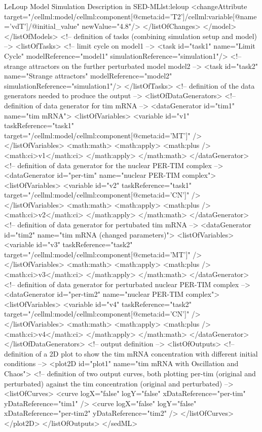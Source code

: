 \begin{myXmlLst}{LeLoup Model Simulation Description in SED-ML}{lst:leloup}
    <changeAttribute target="/cellml:model/cellml:component[@cmeta:id='T2']/cellml:variable[@name='vdT']/@initial_value" newValue="4.8"/>        
   </listOfChanges>
  </model>
 </listOfModels>
 <!-- definition of tasks (combining simulation setup and model) --> 
 <listOfTasks>
  <!-- limit cycle on model1 --> 
  <task id="task1" name="Limit Cycle" modelReference="model1" simulationReference="simulation1"/>
  <!-- strange attractors on the further perturbated model model2 -->
  <task id="task2" name="Strange attractors" modelReference="model2" simulationReference="simulation1"/>
 </listOfTasks>
 <!-- definition of the data generators needed to produce the output -->
 <listOfDataGenerators>
  <!-- definition of data generator for tim mRNA -->
  <dataGenerator id="tim1" name="tim mRNA">
   <listOfVariables>
    <variable id="v1" taskReference="task1" target="/cellml:model/cellml:component[@cmeta:id='MT']" />
   </listOfVariables>
   <math:math>
    <math:apply>
     <math:plus />
     <math:ci>v1</math:ci>
    </math:apply>
   </math:math>
  </dataGenerator>
  <!-- definition of data generator for the nuclear PER-TIM complex -->
  <dataGenerator id="per-tim" name="nuclear PER-TIM complex">
   <listOfVariables>
    <variable id="v2" taskReference="task1" target="/cellml:model/cellml:component[@cmeta:id='CN']" />
   </listOfVariables>
   <math:math>
    <math:apply>
     <math:plus />
     <math:ci>v2</math:ci>
    </math:apply>
   </math:math>
  </dataGenerator>
  <!-- definition of data generator for pertubated tim mRNA -->  
  <dataGenerator id="tim2" name="tim mRNA (changed parameters)">
   <listOfVariables>
    <variable id="v3" taskReference="task2" target="/cellml:model/cellml:component[@cmeta:id='MT']" />
   </listOfVariables>  
   <math:math>
    <math:apply>
     <math:plus />
     <math:ci>v3</math:ci>
    </math:apply>
   </math:math>
  </dataGenerator>
  <!-- definition of data generator for perturbated nuclear PER-TIM complex -->  
  <dataGenerator id="per-tim2" name="nuclear PER-TIM complex">
   <listOfVariables>
    <variable id="v4" taskReference="task2" target="/cellml:model/cellml:component[@cmeta:id='CN']" />
   </listOfVariables>
   <math:math>
    <math:apply>
     <math:plus />
     <math:ci>v4</math:ci>
    </math:apply>
   </math:math>
  </dataGenerator>
 </listOfDataGenerators>
 <!-- output definition --> 
  <listOfOutputs>
   <!-- definition of a 2D plot to show the tim mRNA concentration with different initial conditions -->
   <plot2D id="plot1" name="tim mRNA with Oscillation and Chaos">
    <!-- definition of two output curves, both plotting per-tim (original and perturbated) against the tim concentration (original and perturbated) -->
    <listOfCurves>
     <curve logX="false" logY="false" xDataReference="per-tim" yDataReference="tim1" />
     <curve logX="false" logY="false" xDataReference="per-tim2" yDataReference="tim2" />
    </listOfCurves>
   </plot2D>
  </listOfOutputs>
</sedML>
\end{myXmlLst}



